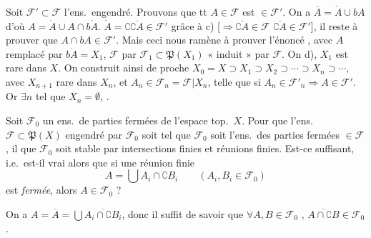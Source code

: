 \documentclass[11pt,a4paper]{article}
\begin{document}
Soit $\mathcal{F}' \subset \mathcal{F}$ l'ens.\ engendré.  Prouvons que tt
$A \in \mathcal{F}$ est $\in \mathcal{F}'$.  On a $\overline{A} = \mathring{A} \cup bA$ d'où $A = \mathring{A}
\cup A \cap b\dot{A}$. $\mathring{A} = \complement\overline{\complement A} \in \mathcal{F}'$
grâce à c) [$\Rightarrow \overline{\complement A} \in \mathcal{F}$ 
$\overline{\complement A} \in \mathcal{F}'$], il reste à prouver que $A
\cap bA \in \mathcal{F}'$. Mais ceci nous \struck{\ill{}} ramène à prouver
l'énoncé , avec $A$ remplacé par $b\dot{A} = X_1$, $\mathcal{F}$
par $\mathcal{F}_1 \subset \mathfrak{P}(X_1)$ « induit » par $\mathcal{F}$.
 On  d), $X_1$ est rare dans
$X$. On construit ainsi de proche  $X_0 = X \supset X_1 \supset
X_2 \supset \cdots \supset X_n \supset \cdots$, avec $X_{n+1}$ rare dans
$X_n$, et $A_n \in \mathcal{F}_n = \mathcal{F} | X_n$, telle que si $A_n
\in \mathcal{F}'_n \Rightarrow A \in \mathcal{F}'$. Or $\exists n$ tel que
$X_n = \emptyset$,  \ill{}.

Soit $\mathcal{F}_0$ un ens.\ de parties fermées de l'espace top.\ $X$. Pour
que l'ens.\ $\mathcal{F} \subset \mathfrak{P}(X)$ 
engendré par $\mathcal{F}_0$ soit tel que $\mathcal{F}_0$ soit 
l'ens.\ des parties fermées $\in \mathcal{F}$, il  
que $\mathcal{F}_0$ soit stable par intersections finies et réunions finies.
Est-ce suffisant, i.e.\ est-il vrai alors que si une réunion finie
\[
  A = \textstyle\bigcup A_i \cap \complement B_i \qquad (A_i, B_i \in
  \mathcal{F}_0)
\]
est \emph{fermée}, alors $A \in \mathcal{F}_0$ ? \struck{\ill{}}

On a $A = \overline{A} = \bigcup \overline{A_i \cap \complement B_i}$, donc
il suffit de savoir que $\forall A, B \in \mathcal{F}_0$
, $\overline{A \cap \complement B} \in
\mathcal{F}_0$.  
\struck{\ill{}}
\end{document}
